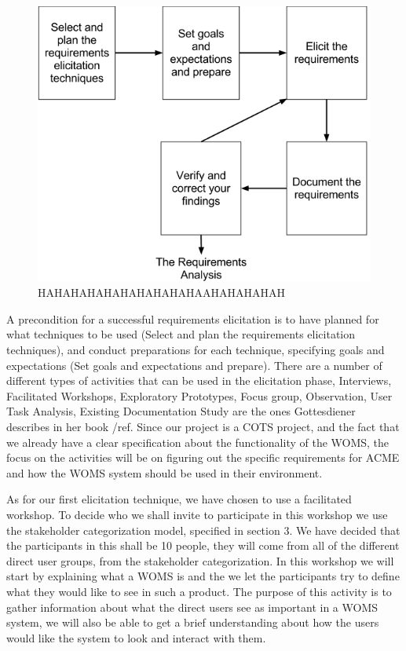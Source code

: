 \documentclass[a4paper]{article}
\begin{document}
\begin{figure}[h!]
	\includegraphics[width=1\textwidth]{images/elicitation_model.png}
	\caption{HAHAHAHAHAHAHAHAHAHAAHAHAHAHAH}
	\label{figure:elicitation}
\end{figure}

A precondition for a successful requirements elicitation is to have planned for what techniques to be used (Select and plan the requirements elicitation techniques), and conduct preparations for each technique, specifying goals and expectations (Set goals and expectations and prepare). There are a number of different types of activities that can be used in the elicitation phase, Interviews, Facilitated Workshops, Exploratory Prototypes, Focus group, Observation, User Task Analysis, Existing Documentation Study are the ones Gottesdiener describes in her book /ref. Since our project is a COTS project, and the fact that we already have a clear specification about the functionality of the WOMS, the focus on the activities will be on figuring out the specific requirements for ACME and how the WOMS system should be used in their environment.

As for our first elicitation technique, we have chosen to use a facilitated workshop. To decide who we shall invite to participate in this workshop we use the stakeholder categorization model, specified in section 3. We have decided that the participants in this shall be 10 people, they will come from all of the different direct user groups, from the stakeholder categorization. In this workshop we will start by explaining what a WOMS is and the we let the participants try to define what they would like to see in such a product. The purpose of this activity is to gather information about what the direct users see as important in a WOMS system, we will also be able to get a brief understanding about how the users would like the system to look and interact with them.
\end{document}
